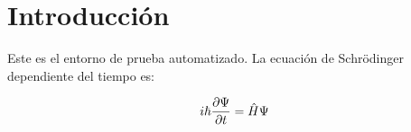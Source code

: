 \documentclass[12pt, a4paper]{book}
\begin{document}
\chapter{Introducción}
Este es el entorno de prueba automatizado. La ecuación de Schrödinger dependiente del tiempo es:

\begin{equation}
i\hbar\pdv{\Psi}{t} = \hat{H}\Psi
\end{equation}
\end{document}
